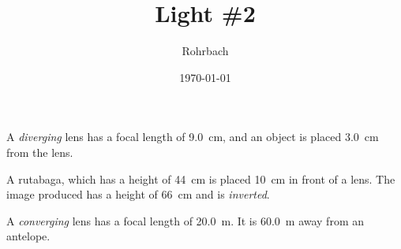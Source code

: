\documentclass[10pt]{exam}
\title{Light \#2}
\author{Rohrbach}
\date{\today}
\begin{document}
\maketitle

\begin{questions}

\question
  A \emph{diverging} lens has a focal length of 9.0~cm, and an object is placed 3.0~cm from the lens.



\question
  A rutabaga, which has a height of 44~cm is placed 10~cm in front of a lens.  The image produced has a height of 66~cm and is \emph{inverted}.


\pagebreak


\question
  A \emph{converging} lens has a focal length of 20.0~m.  It is 60.0~m away from an antelope.

  \begin{parts}

\end{parts}
\end{questions}
\end{document}
